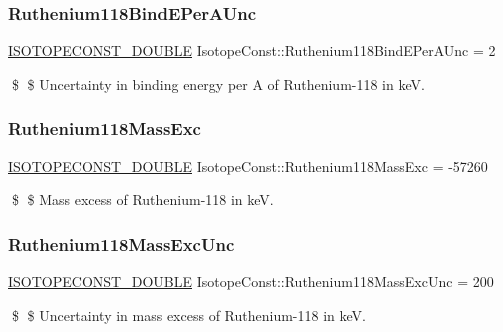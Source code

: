 \subsubsection{\texorpdfstring{Ruthenium118\+Bind\+E\+Per\+A\+Unc}{Ruthenium118BindEPerAUnc}}
{\footnotesize\ttfamily \mbox{\hyperlink{group___isotope_const-_macros_ga8f45a7272ce02c0b4c65c44636ed719a}{I\+S\+O\+T\+O\+P\+E\+C\+O\+N\+S\+T\+\_\+\+D\+O\+U\+B\+LE}} Isotope\+Const\+::\+Ruthenium118\+Bind\+E\+Per\+A\+Unc = 2}

\$ \$ Uncertainty in binding energy per A of Ruthenium-\/118 in keV. \mbox{\label{group___isotope_const-_ruthenium-_ru118_gadb687d6bcc07da742447199a356800f4}} 
\subsubsection{\texorpdfstring{Ruthenium118\+Mass\+Exc}{Ruthenium118MassExc}}
{\footnotesize\ttfamily \mbox{\hyperlink{group___isotope_const-_macros_ga8f45a7272ce02c0b4c65c44636ed719a}{I\+S\+O\+T\+O\+P\+E\+C\+O\+N\+S\+T\+\_\+\+D\+O\+U\+B\+LE}} Isotope\+Const\+::\+Ruthenium118\+Mass\+Exc = -\/57260}

\$ \$ Mass excess of Ruthenium-\/118 in keV. \mbox{\label{group___isotope_const-_ruthenium-_ru118_ga9a1c87963a0895cb70b5c92237f73a00}} 
\subsubsection{\texorpdfstring{Ruthenium118\+Mass\+Exc\+Unc}{Ruthenium118MassExcUnc}}
{\footnotesize\ttfamily \mbox{\hyperlink{group___isotope_const-_macros_ga8f45a7272ce02c0b4c65c44636ed719a}{I\+S\+O\+T\+O\+P\+E\+C\+O\+N\+S\+T\+\_\+\+D\+O\+U\+B\+LE}} Isotope\+Const\+::\+Ruthenium118\+Mass\+Exc\+Unc = 200}

\$ \$ Uncertainty in mass excess of Ruthenium-\/118 in keV. \mbox{\label{group___isotope_const-_ruthenium-_ru118_ga5537d92e9c7688425cb374b542b2a867}} 
